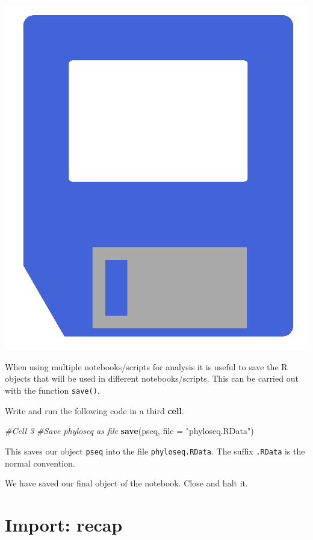 \documentclass[
]{book}
\newenvironment{Shaded}{\begin{snugshade}}{\end{snugshade}}
\newcommand{\AttributeTok}[1]{\textcolor[rgb]{0.13,0.29,0.53}{#1}}
\newcommand{\CommentTok}[1]{\textcolor[rgb]{0.56,0.35,0.01}{\textit{#1}}}
\newcommand{\FunctionTok}[1]{\textcolor[rgb]{0.13,0.29,0.53}{\textbf{#1}}}
\newcommand{\NormalTok}[1]{#1}
\newcommand{\StringTok}[1]{\textcolor[rgb]{0.31,0.60,0.02}{#1}}
\begin{document}
\includegraphics{figures/r_save.png}

When using multiple notebooks/scripts for analysis it is useful to save the R objects that will be used in different notebooks/scripts. This can be carried out with the function \texttt{save()}.

Write and run the following code in a third \textbf{cell}.

\begin{Shaded}
\begin{Highlighting}[]
\CommentTok{\#Cell 3}
\CommentTok{\#Save phyloseq as file}
\FunctionTok{save}\NormalTok{(pseq, }\AttributeTok{file =} \StringTok{"phyloseq.RData"}\NormalTok{)}
\end{Highlighting}
\end{Shaded}

This saves our object \texttt{pseq} into the file \texttt{phyloseq.RData}. The suffix \texttt{.RData} is the normal convention.

We have saved our final object of the notebook. Close and halt it.

\hypertarget{import-recap}{%
\section{Import: recap}\label{import-recap}}
\end{document}
